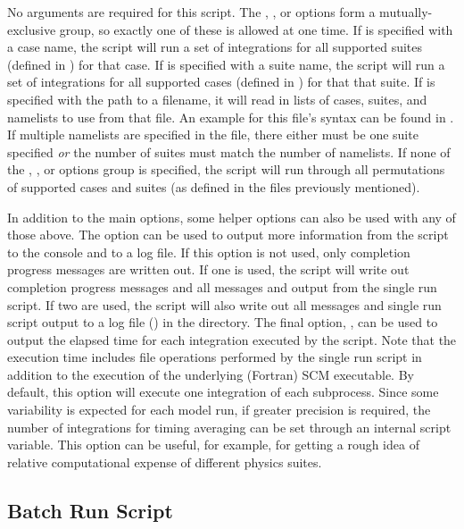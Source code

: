 No arguments are required for this script. The , , or  options form a mutually-exclusive group, so exactly one of these is allowed at one time. If  is specified with a case name, the script will run a set of integrations for all supported suites (defined in ) for that case. If  is specified with a suite name, the script will run a set of integrations for all supported cases (defined in ) for that that suite. If  is specified with the path to a filename, it will read in lists of cases, suites, and namelists to use from that file. An example for this file's syntax can be found in . If multiple namelists are specified in the file, there either must be one suite specified \emph{or} the number of suites must match the number of namelists. If none of the , , or  options group is specified, the script will run through all permutations of supported cases and suites (as defined in the files previously mentioned).

In addition to the main options, some helper options can also be used with any of those above. The  option can be used to output more information from the script to the console and to a log file. If this option is not used, only completion progress messages are written out. If one  is used, the script will write out completion progress messages and all messages and output from the single run script. If two  are used, the script will also write out all messages and single run script output to a log file () in the  directory. The final option, , can be used to output the elapsed time for each integration executed by the script. Note that the execution time includes file operations performed by the single run script in addition to the execution of the underlying (Fortran) SCM executable. By default, this option will execute one integration of each subprocess. Since some variability is expected for each model run, if greater precision is required, the number of integrations for timing averaging can be set through an internal script variable. This option can be useful, for example, for getting a rough idea of relative computational expense of different physics suites.

\subsection{Batch Run Script}

